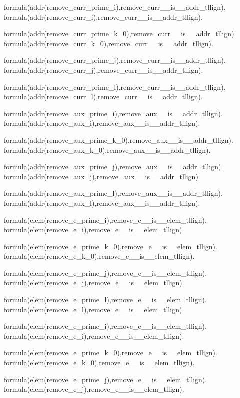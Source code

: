 formula(addr(remove\_curr\_prime\_i),remove\_curr\_\_is\_\_addr\_tllign).    formula(addr(remove\_curr\_i),remove\_curr\_\_is\_\_addr\_tllign).  

formula(addr(remove\_curr\_prime\_k\_0),remove\_curr\_\_is\_\_addr\_tllign).  formula(addr(remove\_curr\_k\_0),remove\_curr\_\_is\_\_addr\_tllign).    

formula(addr(remove\_curr\_prime\_j),remove\_curr\_\_is\_\_addr\_tllign).    formula(addr(remove\_curr\_j),remove\_curr\_\_is\_\_addr\_tllign).  

formula(addr(remove\_curr\_prime\_l),remove\_curr\_\_is\_\_addr\_tllign).    formula(addr(remove\_curr\_l),remove\_curr\_\_is\_\_addr\_tllign).  

formula(addr(remove\_aux\_prime\_i),remove\_aux\_\_is\_\_addr\_tllign).  formula(addr(remove\_aux\_i),remove\_aux\_\_is\_\_addr\_tllign).    

formula(addr(remove\_aux\_prime\_k\_0),remove\_aux\_\_is\_\_addr\_tllign).    formula(addr(remove\_aux\_k\_0),remove\_aux\_\_is\_\_addr\_tllign).  

formula(addr(remove\_aux\_prime\_j),remove\_aux\_\_is\_\_addr\_tllign).  formula(addr(remove\_aux\_j),remove\_aux\_\_is\_\_addr\_tllign).    

formula(addr(remove\_aux\_prime\_l),remove\_aux\_\_is\_\_addr\_tllign).  formula(addr(remove\_aux\_l),remove\_aux\_\_is\_\_addr\_tllign).    

formula(elem(remove\_e\_prime\_i),remove\_e\_\_is\_\_elem\_tllign).  formula(elem(remove\_e\_i),remove\_e\_\_is\_\_elem\_tllign).    

formula(elem(remove\_e\_prime\_k\_0),remove\_e\_\_is\_\_elem\_tllign).    formula(elem(remove\_e\_k\_0),remove\_e\_\_is\_\_elem\_tllign).  

formula(elem(remove\_e\_prime\_j),remove\_e\_\_is\_\_elem\_tllign).  formula(elem(remove\_e\_j),remove\_e\_\_is\_\_elem\_tllign).    

formula(elem(remove\_e\_prime\_l),remove\_e\_\_is\_\_elem\_tllign).  formula(elem(remove\_e\_l),remove\_e\_\_is\_\_elem\_tllign).    

formula(elem(remove\_e\_prime\_i),remove\_e\_\_is\_\_elem\_tllign).  formula(elem(remove\_e\_i),remove\_e\_\_is\_\_elem\_tllign).    

formula(elem(remove\_e\_prime\_k\_0),remove\_e\_\_is\_\_elem\_tllign).    formula(elem(remove\_e\_k\_0),remove\_e\_\_is\_\_elem\_tllign).  

formula(elem(remove\_e\_prime\_j),remove\_e\_\_is\_\_elem\_tllign).  formula(elem(remove\_e\_j),remove\_e\_\_is\_\_elem\_tllign).    

